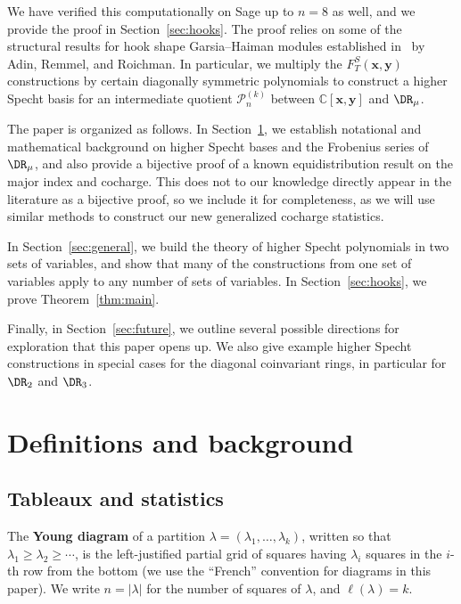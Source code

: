 We have verified this computationally on Sage up to $n=8$ as well, and we provide the proof in Section~\ref{sec:hooks}.  The proof relies on some of the structural results for hook shape Garsia--Haiman modules established in~\cite{HookBases} by Adin, Remmel, and Roichman.  In particular, we multiply the $F_T^S(\mathbf{x},\mathbf{y})$ constructions by certain diagonally symmetric polynomials to construct a higher Specht basis for an intermediate quotient $\mathcal{P}_n^{(k)}$ between $\mathbb{C}[\mathbf{x},\mathbf{y}]$ and $\DR_\mu$.

The paper is organized as follows.  In Section~\ref{sec:background}, we establish notational and mathematical background on higher Specht bases and the Frobenius series of $\DR_\mu$, and also provide a bijective proof of a known equidistribution result on the major index and cocharge.  This does not to our knowledge directly appear in the literature as a bijective proof, so we include it for completeness, as we will use similar methods to construct our new generalized cocharge statistics.

In Section~\ref{sec:general}, we build the theory of higher Specht polynomials in two sets of variables, and show that many of the constructions from one set of variables apply to any number of sets of variables.  In Section~\ref{sec:hooks}, we prove Theorem~\ref{thm:main}.

Finally, in Section~\ref{sec:future}, we outline several possible directions for exploration that this paper opens up.  We also give example higher Specht constructions in special cases for the diagonal coinvariant rings, in particular for $\DR_2$ and $\DR_3$.


\section{Definitions and background}\label{sec:background}

\subsection{Tableaux and statistics}

The \textbf{Young diagram} of a partition $\lambda=(\lambda_1,\ldots,\lambda_k)$, written so that $\lambda_1\ge \lambda_2\ge \cdots$, is the left-justified partial grid of squares having $\lambda_i$ squares in the $i$-th row from the bottom (we use the ``French'' convention for diagrams in this paper).  We write $n=|\lambda|$ for the number of squares of $\lambda$, and $\ell(\lambda)=k$.

